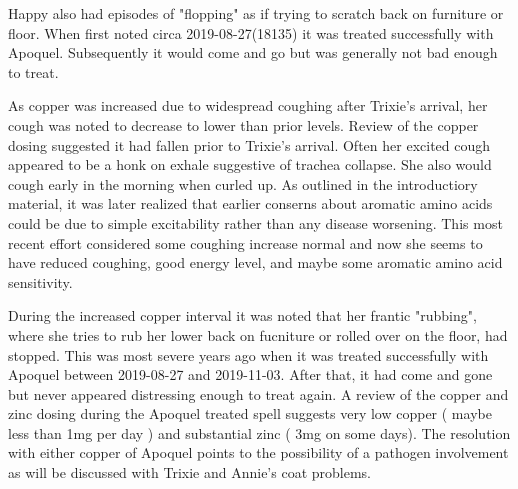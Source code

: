 Happy also had episodes of "flopping"  as if trying to scratch
back on furniture or floor. When first noted circa 2019-08-27(18135)
it was treated successfully with Apoquel. Subsequently it would
come and go but was generally not bad enough to treat.
 



As copper was increased due to widespread coughing after Trixie's
arrival, her cough was noted to decrease to lower than prior levels.
Review of the copper dosing suggested it had fallen prior to Trixie's
arrival.
Often her excited cough appeared to be a honk on exhale suggestive of
trachea collapse. She also would cough early in the morning
when curled up. 
As outlined in the introductiory material, it was later realized 
that earlier conserns about aromatic amino acids could be
due to simple excitability rather than any disease worsening.
This most recent effort considered some coughing increase normal
and now she seems to have reduced coughing, good energy level,
and maybe some  aromatic amino acid sensitivity. 

During the increased copper interval it was noted that
her frantic "rubbing", where she tries to rub her lower
back on fucniture or rolled over on the floor,
had stopped. This was most severe years ago when it
was treated successfully with Apoquel between 2019-08-27
and 2019-11-03. After that, it had come and gone but never
appeared distressing enough to treat again. A review of the
copper and zinc dosing during the Apoquel treated spell
suggests very low copper ( maybe less than 1mg per day )
and substantial zinc ( 3mg on some days). The resolution
with either copper of Apoquel points to the possibility of
a pathogen involvement as will be discussed with Trixie
and Annie's coat problems. 

